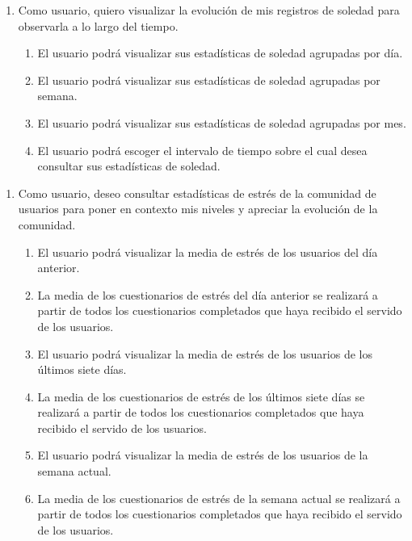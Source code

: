         \begin{enumerate}[resume=req-usuario,label=\textbf{\texttt{RU-\arabic*}}]
            \item Como usuario, quiero visualizar la evolución de mis registros de soledad para observarla a lo largo del tiempo.
            \begin{enumerate}[resume=req-funcionales,label=\textbf{\texttt{RF-\arabic*}}]
                \item El usuario podrá visualizar sus estadísticas de soledad agrupadas por día.
                \item El usuario podrá visualizar sus estadísticas de soledad agrupadas por semana.
                \item El usuario podrá visualizar sus estadísticas de soledad agrupadas por mes.
                \item El usuario podrá escoger el intervalo de tiempo sobre el cual desea consultar sus estadísticas de soledad.
            \end{enumerate}
        \end{enumerate}
        \begin{enumerate}[resume=req-usuario,label=\textbf{\texttt{RU-\arabic*}}]
            \item Como usuario, deseo consultar estadísticas de estrés de la comunidad de usuarios para poner en contexto mis niveles y apreciar la evolución de la comunidad.
            \begin{enumerate}[resume=req-funcionales,label=\textbf{\texttt{RF-\arabic*}}]
                \item El usuario podrá visualizar la media de estrés de los usuarios del día anterior.
                \item La media de los cuestionarios de estrés del día anterior se realizará a partir de todos los cuestionarios completados que haya recibido el servido de los usuarios.
                \item El usuario podrá visualizar la media de estrés de los usuarios de los últimos siete días.
                \item La media de los cuestionarios de estrés de los últimos siete días se realizará a partir de todos los cuestionarios completados que haya recibido el servido de los usuarios.
                \item El usuario podrá visualizar la media de estrés de los usuarios de la semana actual.
                \item La media de los cuestionarios de estrés de la semana actual se realizará a partir de todos los cuestionarios completados que haya recibido el servido de los usuarios.
            \end{enumerate}
        \end{enumerate}
